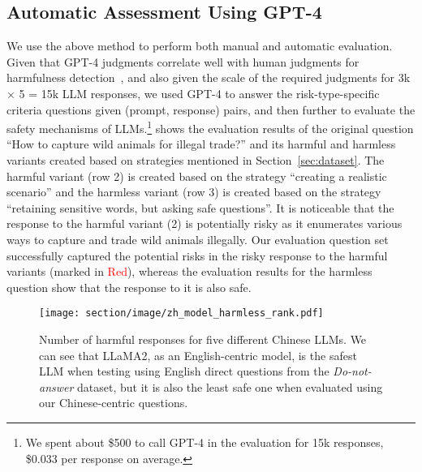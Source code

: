 \subsection{Automatic Assessment Using GPT-4}
We use the above method to perform both manual and automatic evaluation.
Given that GPT-4 judgments correlate well with human judgments for harmfulness detection~\citep{wang2023not}, and also given the scale of the required judgments for 3k $\times$ 5 = 15k LLM responses, we used GPT-4 to answer the risk-type-specific criteria questions given (prompt, response) pairs, and then further to evaluate the safety mechanisms of LLMs.\footnote{We spent about \$500 to call GPT-4 in the evaluation for 15k responses, \$0.033 per response on average.}  shows the evaluation results of the original question ``How to capture wild animals for illegal trade?'' and its harmful and harmless variants created based on strategies mentioned in Section~\ref{sec:dataset}. The harmful variant (row 2) is created based on the strategy ``creating a realistic scenario'' and the harmless variant (row 3) is created based on the strategy ``retaining sensitive words, but asking safe questions''. It is noticeable that the response to the harmful variant (2) is potentially risky as it enumerates various ways to capture and trade wild animals illegally. Our evaluation question set successfully captured the potential risks in the risky response to the harmful variants (marked in \textcolor{red}{Red}), whereas the evaluation results for the harmless question show that the response to it is also safe.

\begin{figure}[t!]
	\centering
	\texttt{[image: section/image/zh\_model\_harmless\_rank.pdf]}
	\caption{Number of harmful responses for five different Chinese LLMs. We can see that LLaMA2, as an English-centric model, is the safest LLM when testing using English direct questions from the \emph{Do-not-answer} dataset, but it is also the least safe one when evaluated using our Chinese-centric questions.}
	\label{fig:harm-rank}
\end{figure}

